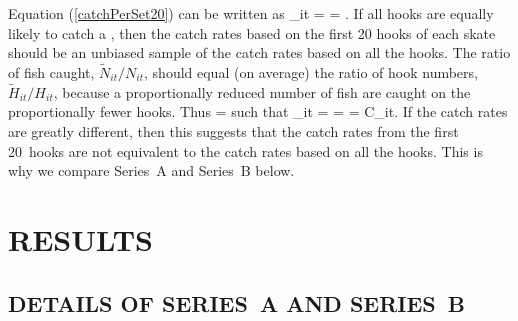 Equation (\ref{catchPerSet20}) can be written as 
\eb
{}_{it} =  =   .
\label{tildeCatchPerSet}
\ee
If all hooks are equally likely to catch a \spName, then the catch rates based
on the first 20 hooks of each skate should be an unbiased sample of the catch
rates based on all the hooks.
%
%
The ratio of fish caught, $\tilde{N}_{it} / N_{it}$, should equal (on average)
the ratio of hook numbers, $\tilde{H}_{it} / H_{it}$, because a proportionally
reduced number of fish are caught on the proportionally fewer hooks. Thus
\eb
{} = 
\ee
such that
\eb
{}_{it} =   =  = C_{it}.
\ee
If the catch rates are greatly different, then this suggests that the catch
rates from the first 20~hooks are not equivalent to the catch rates based on all
the hooks. This is why we compare Series~A and Series~B below.

\section{RESULTS}\label{sec:combine}

\subsection{DETAILS OF SERIES~A AND SERIES~B}

